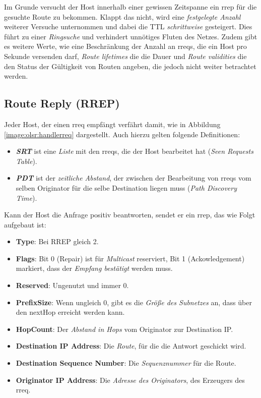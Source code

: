 Im Grunde versucht der Host innerhalb einer gewissen Zeitspanne ein \gls{rrep} für die gesuchte Route zu bekommen. Klappt das nicht, wird eine \textit{festgelegte Anzahl} weiterer Versuche unternommen und dabei die TTL \textit{schrittweise} gesteigert. Dies führt zu einer \textit{Ringsuche} und verhindert unnötiges Fluten des Netzes. Zudem gibt es weitere Werte, wie eine Beschränkung der Anzahl an \glspl{rreq}, die ein Host pro Sekunde versenden darf, \textit{Route lifetimes} die die Dauer und \textit{Route validities} die den Status der Gültigkeit von Routen angeben, die jedoch nicht weiter betrachtet werden.

\subsection{Route Reply (RREP)}
\label{chapter:routing:aodv:funktion:rrep}

Jeder Host, der einen \gls{rreq} empfängt verfährt damit, wie in Abbildung \ref{image:olsr:handlerreq} dargestellt. Auch hierzu gelten folgende Definitionen:

\begin{itemize}
\item \textbf{\textit{SRT}} ist eine \textit{Liste} mit den \glspl{rreq}, die der Host bearbeitet hat (\textit{Seen Requests Table}).
\item \textbf{\textit{PDT}} ist der \textit{zeitliche Abstand}, der zwischen der Bearbeitung von \glspl{rreq} vom selben Originator für die selbe Destination liegen muss (\textit{Path Discovery Time}).
\end{itemize}

Kann der Host die Anfrage positiv beantworten, sendet er ein \gls{rrep}, das wie Folgt aufgebaut ist:

\begin{itemize}
\item \textbf{Type}: Bei RREP gleich 2.
\item \textbf{Flags}: Bit 0 (Repair) ist für \textit{Multicast} reserviert, Bit 1 (Ackowledgement) markiert, dass der \textit{Empfang bestätigt} werden muss.
\item \textbf{Reserved}: Ungenutzt und immer 0.
\item \textbf{PrefixSize}: Wenn ungleich 0, gibt es die \textit{Größe des Subnetzes} an, dass über den nextHop erreicht werden kann.
\item \textbf{HopCount}: Der \textit{Abstand in Hops} vom Originator zur Destination IP.
\item \textbf{Destination IP Address}: Die \textit{Route}, für die die Antwort geschickt wird.
\item \textbf{Destination Sequence Number}: Die \textit{Sequenznummer} für die Route.
\item \textbf{Originator IP Address}: Die \textit{Adresse des Originators}, des Erzeugers des \gls{rreq}.
\end{itemize}

